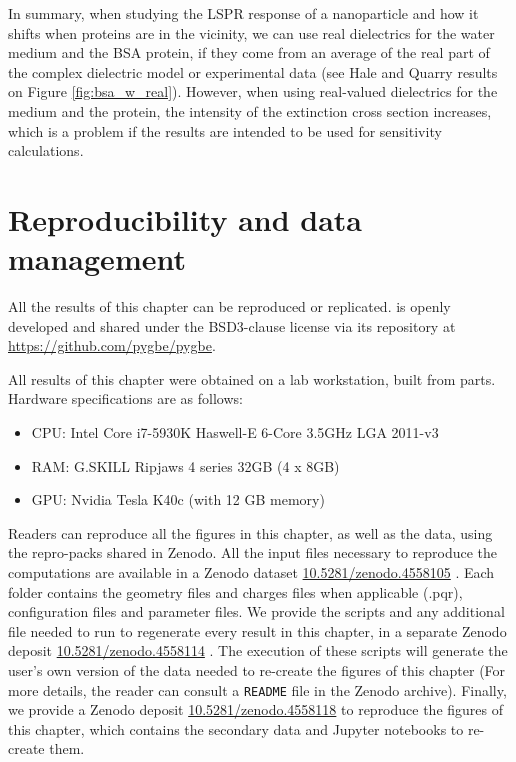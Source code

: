 In summary, when studying the LSPR response of a nanoparticle and how it shifts when proteins are in the vicinity, we can use 
real dielectrics for the water medium and the BSA protein, if they come from an average of the real part of the complex dielectric model 
or experimental data (see Hale and Quarry results on Figure \ref{fig:bsa_w_real}). However, when using real-valued dielectrics for the medium 
and the protein, the intensity of the extinction cross section increases, which is a problem if the results are intended to be used for 
sensitivity calculations. 

\section{Reproducibility and data management} \label{sec:repro_ell}
 
All the results of this chapter can be reproduced or replicated. \pygbe is openly developed and 
shared under the BSD3-clause license via its repository at \url{https://github.com/pygbe/pygbe}.

All results of this chapter were obtained on a lab workstation, built from parts. Hardware specifications are as follows:

\begin{itemize}
  \item CPU: Intel Core i7-5930K Haswell-E 6-Core 3.5GHz LGA 2011-v3
  \item RAM: G.SKILL Ripjaws 4 series 32GB (4 x 8GB)
  \item GPU: Nvidia Tesla K40c (with 12 GB memory)
\end{itemize}

Readers can reproduce all the figures in this chapter, as well as the data, using the repro-packs shared in Zenodo. 
All the input files necessary to reproduce the computations are available in a Zenodo dataset \href{https://doi.org/10.5281/zenodo.4558105}{10.5281/zenodo.4558105} \cite{Clementi2021-Zen_IF}. 
Each folder contains the geometry files and charges files when applicable (.pqr), configuration files and parameter files.
We provide the scripts and any additional file needed to run \pygbe to regenerate every result in this chapter, in a 
separate Zenodo deposit \href{https://doi.org/10.5281/zenodo.4558114}{10.5281/zenodo.4558114} \cite{Clementi2021-Zen_EF}. The execution of these scripts will generate the user's own version of the data 
needed to re-create the figures of this chapter (For more details, the reader can consult a \texttt{README} file in the Zenodo archive).
Finally, we provide a Zenodo deposit \href{https://doi.org/10.5281/zenodo.4558118}{10.5281/zenodo.4558118} \cite{Clementi2021-Zen_RP} to reproduce the figures of this chapter, which contains the secondary data and 
Jupyter notebooks to re-create them. 
